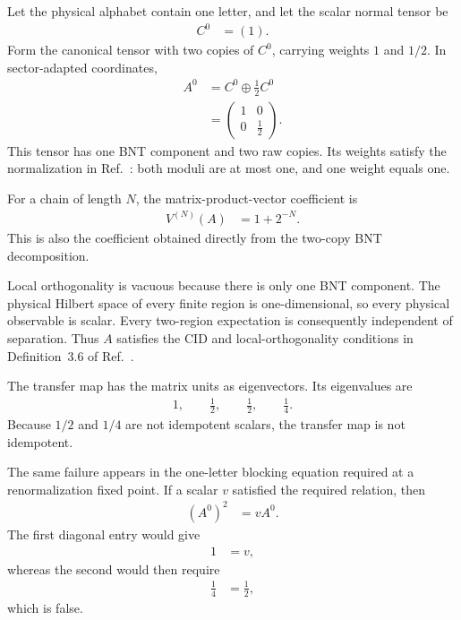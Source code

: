 \documentclass{article}
\begin{document}
Let the physical alphabet contain one letter, and let the scalar normal tensor
be
\begin{align}
    C^0 &= (1).
    \label{eq:cpsv16_pure_zcl_raw_weight_counterexample_scalar_normal_tensor}
\end{align}
Form the canonical tensor with two copies of $C^0$, carrying weights $1$ and
$1/2$. In sector-adapted coordinates,
\begin{align}
    A^0
        &= C^0\oplus\frac12 C^0
    \label{eq:cpsv16_pure_zcl_raw_weight_counterexample_two_copy_sum}\\
        &= \begin{pmatrix}
            1 & 0\\
            0 & \frac12
        \end{pmatrix}.
    \label{eq:cpsv16_pure_zcl_raw_weight_counterexample_diagonal_tensor}
\end{align}
This tensor has one BNT component and two raw copies. Its weights satisfy the
normalization in Ref.~\cite{Cirac2016MPDO_arXiv}: both moduli are at most one,
and one weight equals one.

For a chain of length $N$, the matrix-product-vector coefficient is
\begin{align}
    V^{(N)}(A)
        &= 1+2^{-N}.
    \label{eq:cpsv16_pure_zcl_raw_weight_counterexample_chain_coefficient}
\end{align}
This is also the coefficient obtained directly from the two-copy BNT
decomposition.

Local orthogonality is vacuous because there is only one BNT component. The
physical Hilbert space of every finite region is one-dimensional, so every
physical observable is scalar. Every two-region expectation is consequently
independent of separation. Thus $A$ satisfies the CID and local-orthogonality
conditions in Definition~3.6 of Ref.~\cite{Cirac2016MPDO_arXiv}.

The transfer map has the matrix units as eigenvectors. Its eigenvalues are
\begin{align}
    1,\qquad \frac12,\qquad \frac12,\qquad \frac14.
    \label{eq:cpsv16_pure_zcl_raw_weight_counterexample_transfer_spectrum}
\end{align}
Because $1/2$ and $1/4$ are not idempotent scalars, the transfer map is not
idempotent.

The same failure appears in the one-letter blocking equation required at a
renormalization fixed point. If a scalar $v$ satisfied the required relation,
then
\begin{align}
    (A^0)^2 &= vA^0.
    \label{eq:cpsv16_pure_zcl_raw_weight_counterexample_blocking_equation}
\end{align}
The first diagonal entry would give
\begin{align}
    1 &= v,
    \label{eq:cpsv16_pure_zcl_raw_weight_counterexample_first_entry}
\end{align}
whereas the second would then require
\begin{align}
    \frac14 &= \frac12,
    \label{eq:cpsv16_pure_zcl_raw_weight_counterexample_second_entry_contradiction}
\end{align}
which is false.
\end{document}
